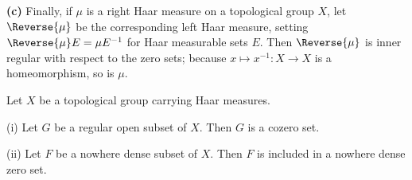 {\medskip

{\bf (c)} Finally, if $\mu$ is a right Haar measure on a topological
group $X$, let $\Reverse{\mu}$ be the corresponding left Haar measure, setting
$\Reverse{\mu} E=\mu E^{-1}$ for Haar measurable sets $E$.   Then
$\Reverse{\mu}$ is
inner regular with respect to the zero sets;  because
$x\mapsto x^{-1}:X\to X$ is a homeomorphism, so is $\mu$.
}%

 Let $X$ be a topological group carrying
Haar measures.

(i) Let $G$ be a regular open subset of $X$.   Then $G$ is a cozero set.

(ii) Let $F$ be a nowhere dense subset of $X$.   Then $F$ is included in
a nowhere dense zero set.

